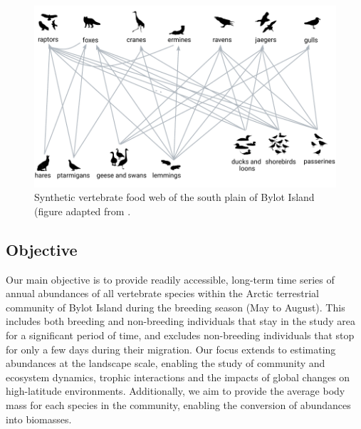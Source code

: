 \documentclass[a4paper,twoside,10pt]{article}
\begin{document}
\begin{figure}[H]
\centering
\includegraphics[width=0.75\linewidth]{figures/food_web.pdf} 
\caption{Synthetic vertebrate food web of the south plain of Bylot Island (figure adapted from \citet{gauthier2011}.}
\label{figure:food_web}
\end{figure}

\subsection*{Objective}
Our main objective is to provide readily accessible, long-term time series of annual abundances of all vertebrate species within the Arctic terrestrial community of Bylot Island during the breeding season (May to August). This includes both breeding and non-breeding individuals that stay in the study area for a significant period of time, and excludes non-breeding individuals that stop for only a few days during their migration. Our focus extends to estimating abundances at the landscape scale, enabling the study of community and ecosystem dynamics, trophic interactions and the impacts of global changes on high-latitude environments. Additionally, we aim to provide the average body mass for each species in the community, enabling the conversion of abundances into biomasses.
\newpage
\end{document}
